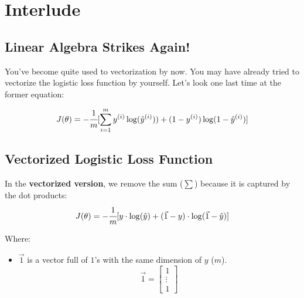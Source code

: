 
\section*{Interlude}
\subsection*{Linear Algebra Strikes Again!}

You've become quite used to vectorization by now.
You may have already tried to vectorize the logistic loss function by yourself.
Let's look one last time at the former equation:

$$
J( \theta) = -\cfrac{1}{m} \lbrack \sum_{i = 1}^{m} y^{(i)}\log(\hat{y}^{(i)})) + (1 - y^{(i)})\log(1 - \hat{y}^{(i)})\rbrack
$$

\subsection*{Vectorized Logistic Loss Function}
In the \textbf{vectorized version}, we remove the sum ($\sum$) because it is captured by the dot products:
$$
J( \theta) = -\cfrac{1}{m} \lbrack y \cdot \log(\hat{y}) + (\vec{1} - y) \cdot \log(\vec{1} - \hat{y})\rbrack
$$

Where:
\begin{itemize}
       \item $\vec{1}$ is a vector full of $1$'s with the same dimension of $y$ ($m$).
             $$
             \vec{1} = \begin{bmatrix}
                 1 \\
                 \vdots \\
                 1
             \end{bmatrix}
             $$
\end{itemize}


